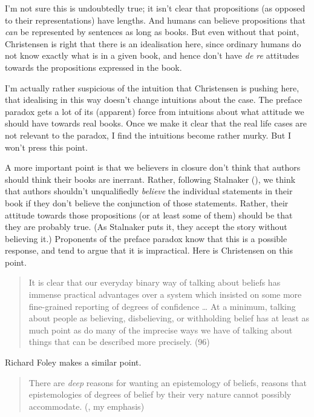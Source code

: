 \documentclass[
  11pt,
  letterpaper,
  DIV=11,
  numbers=noendperiod,
  twoside]{scrartcl}
\begin{document}
I'm not sure this is undoubtedly true; it isn't clear that propositions
(as opposed to their representations) have lengths. And humans can
believe propositions that \emph{can} be represented by sentences as long
as books. But even without that point, Christensen is right that there
is an idealisation here, since ordinary humans do not know exactly what
is in a given book, and hence don't have \emph{de re} attitudes towards
the propositions expressed in the book.

I'm actually rather suspicious of the intuition that Christensen is
pushing here, that idealising in this way doesn't change intuitions
about the case. The preface paradox gets a lot of its (apparent) force
from intuitions about what attitude we should have towards real books.
Once we make it clear that the real life cases are not relevant to the
paradox, I find the intuitions become rather murky. But I won't press
this point.

A more important point is that we believers in closure don't think that
authors should think their books are inerrant. Rather, following
Stalnaker (), we think that authors
shouldn't unqualifiedly \emph{believe} the individual statements in
their book if they don't believe the conjunction of those statements.
Rather, their attitude towards those propositions (or at least some of
them) should be that they are probably true. (As Stalnaker puts it, they
accept the story without believing it.) Proponents of the preface
paradox know that this is a possible response, and tend to argue that it
is impractical. Here is Christensen on this point.

\begin{quote}
It is clear that our everyday binary way of talking about beliefs has
immense practical advantages over a system which insisted on some more
fine-grained reporting of degrees of confidence \ldots{} At a minimum,
talking about people as believing, disbelieving, or withholding belief
has at least as much point as do many of the imprecise ways we have of
talking about things that can be described more precisely. (96)
\end{quote}

Richard Foley makes a similar point.

\begin{quote}
There are \emph{deep} reasons for wanting an epistemology of beliefs,
reasons that epistemologies of degrees of belief by their very nature
cannot possibly accommodate. (,
my emphasis)
\end{quote}
\end{document}
